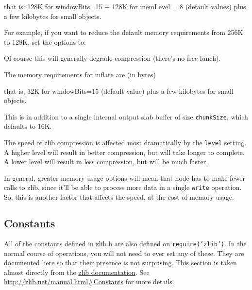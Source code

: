 that is: 128K for windowBits=15 + 128K for memLevel = 8 (default values)
plus a few kilobytes for small objects.

For example, if you want to reduce the default memory requirements from
256K to 128K, set the options to:

\begin{Shaded}
\begin{Highlighting}[]
\NormalTok{\{ }\NormalTok{: }\NormalTok{, }\NormalTok{: } \NormalTok{\}}
\end{Highlighting}
\end{Shaded}

Of course this will generally degrade compression (there's no free
lunch).

The memory requirements for inflate are (in bytes)

\begin{Shaded}
\begin{Highlighting}[]
 
\end{Highlighting}
\end{Shaded}

that is, 32K for windowBits=15 (default value) plus a few kilobytes for
small objects.

This is in addition to a single internal output slab buffer of size
\texttt{chunkSize}, which defaults to 16K.

The speed of zlib compression is affected most dramatically by the
\texttt{level} setting. A higher level will result in better
compression, but will take longer to complete. A lower level will result
in less compression, but will be much faster.

In general, greater memory usage options will mean that node has to make
fewer calls to zlib, since it'll be able to process more data in a
single \texttt{write} operation. So, this is another factor that affects
the speed, at the cost of memory usage.

\subsection{Constants}

All of the constants defined in zlib.h are also defined on
\texttt{require('zlib')}. In the normal course of operations, you will
not need to ever set any of these. They are documented here so that
their presence is not surprising. This section is taken almost directly
from the \href{http://zlib.net/manual.html\#Constants}{zlib
documentation}. See \url{http://zlib.net/manual.html#Constants} for more
details.

